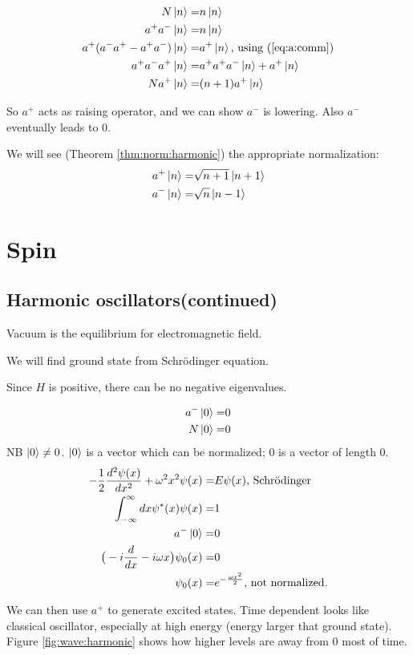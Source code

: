\documentclass[]{article}
\begin{document}
\begin{align*}
N\ket{n} =& n\ket{n}\\
a^+a^-\ket{n} =& n\ket{n}\\
a^+(a^-a^+ - a^+a^-)\ket{n} =& a^+\ket{n}\text{, using (\ref{eq:a:comm})}\\
a^+a^-a^+ \ket{n} =& a^+a^+a^-\ket{n} + a^+\ket{n}\\
N a^+ \ket{n} =& (n+1) a^+ \ket{n}
\end{align*}

So $a^+$ acts as raising operator, and we can show $a^-$ is lowering. Also $a^-$ eventually leads to $0$.

We will see (Theorem \ref{thm:norm:harmonic}) the appropriate normalization:
\begin{align*}
a^+\ket{n} =& \sqrt{n+1}\ket{n+1}\\
a^-\ket{n} =& \sqrt{n}\ket{n-1}
\end{align*}
 
\section{Spin}

\subsection{Harmonic oscillators(continued)}
Vacuum is the equilibrium for electromagnetic field. 

We will find ground state from Schr\"odinger equation.

Since $H$ is positive, there can be no negative eigenvalues.

\begin{align*}
a^-\ket{0}=&0\\
N\ket{0}=& 0
\end{align*}
NB $\ket{0} \ne 0$. $\ket{0}$ is a vector which can be normalized; $0$ is a vector of length 0.
\begin{align*}
-\frac{1}{2}\frac{d^2 \psi(x)}{dx^2} + \omega^2 x^2 \psi(x)=& E\psi(x)\text{, Schr\"odinger}\\
\int_{-\infty}^{\infty} dx \psi^*(x) \psi(x) =& 1\\
a^-\ket{0}=& 0\\
\big(-i \frac{d}{dx} - i \omega x \big)\psi_0(x) =& 0\\
\psi_0(x) =& e^{-\frac{\omega x^2}{2}} \text{, not normalized.}
\end{align*}

We can then use $a^+$  to generate excited states. Time dependent looks like classical oscillator, especially at high energy (energy larger that ground state). Figure \ref{fig:wave:harmonic} shows how higher levels are away from 0 most of time.
\end{document}
